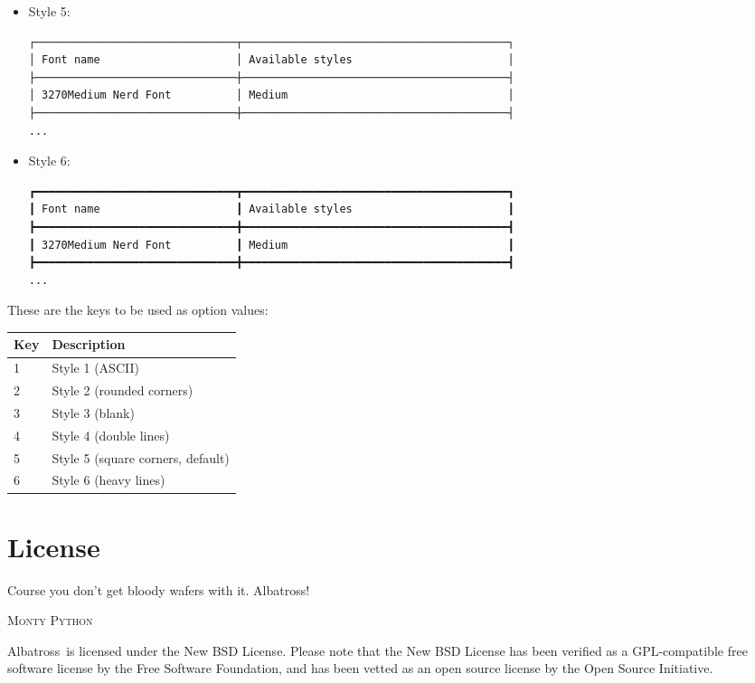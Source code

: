 \documentclass[12pt,article,a4paper,oneside]{memoir}
\newcommand{\albatross}{Albatross}
\begin{document}
\begin{itemize}[label={--}]
\item Style 5:

\begin{Verbatim}[fontsize=\scriptsize]
┌───────────────────────────────┬─────────────────────────────────────────┐
│ Font name                     │ Available styles                        │
├───────────────────────────────┼─────────────────────────────────────────┤
│ 3270Medium Nerd Font          │ Medium                                  │
├───────────────────────────────┼─────────────────────────────────────────┤
...
\end{Verbatim}

\item Style 6:

\begin{Verbatim}[fontsize=\scriptsize]
┏━━━━━━━━━━━━━━━━━━━━━━━━━━━━━━━┳━━━━━━━━━━━━━━━━━━━━━━━━━━━━━━━━━━━━━━━━━┓
┃ Font name                     ┃ Available styles                        ┃
┣━━━━━━━━━━━━━━━━━━━━━━━━━━━━━━━╋━━━━━━━━━━━━━━━━━━━━━━━━━━━━━━━━━━━━━━━━━┫
┃ 3270Medium Nerd Font          ┃ Medium                                  ┃
┣━━━━━━━━━━━━━━━━━━━━━━━━━━━━━━━╋━━━━━━━━━━━━━━━━━━━━━━━━━━━━━━━━━━━━━━━━━┫
...
\end{Verbatim}
\end{itemize}

These are the keys to be used as option values:

\bigskip
\bigskip

{\centering
\begin{tabular}{@{}ll@{}}
\toprule
Key & Description\\
\midrule
1 & Style 1 (ASCII)\\
2 & Style 2 (rounded corners)\\
3 & Style 3 (blank)\\
4 & Style 4 (double lines)\\
5 & Style 5 (square corners, default)\\
6 & Style 6 (heavy lines)\\
\bottomrule
\end{tabular}\par}

\chapter*{License}

\epigraph{Course you don't get bloody wafers with it. Albatross!}{\textsc{Monty
Python}}

\albatross\ is licensed under the New BSD License. Please note that the New BSD
License has been verified as a GPL-compatible free software license by the Free
Software Foundation, and has been vetted as an open source license by the Open
Source Initiative.
\end{document}
